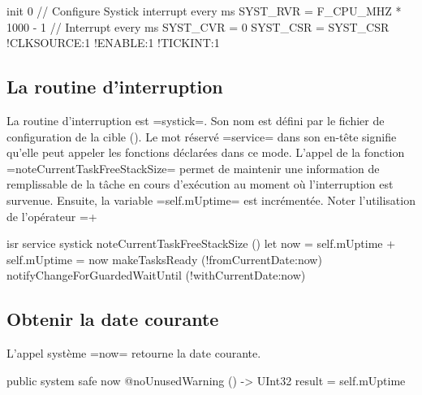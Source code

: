 \begin{OMNIBUS}
init 0 { // Configure Systick interrupt every ms
  SYST_RVR = F_CPU_MHZ * 1000 - 1 // Interrupt every ms
  SYST_CVR = 0
  SYST_CSR = {SYST_CSR !CLKSOURCE:1 !ENABLE:1 !TICKINT:1}
}
\end{OMNIBUS}


\subsection{La routine d'interruption}

La routine d'interruption est \omnibus=systick=. Son nom est défini par le fichier de configuration de la cible (). Le mot réservé \omnibus=service= dans son en-tête signifie qu'elle peut appeler les fonctions déclarées dans ce mode. L'appel de la fonction \omnibus=noteCurrentTaskFreeStackSize= permet de maintenir une information de remplissable de la tâche en cours d'exécution au moment où l'interruption est survenue. Ensuite, la variable \omnibus=self.mUptime= est incrémentée. Noter l'utilisation de l'opérateur \omnibus=+%

\begin{OMNIBUS}
isr service systick {
  noteCurrentTaskFreeStackSize ()
  let now = self.mUptime +%
  self.mUptime = now
  makeTasksReady (!fromCurrentDate:now)
  notifyChangeForGuardedWaitUntil (!withCurrentDate:now)
}
\end{OMNIBUS}




\subsection{Obtenir la date courante}

L'appel système \omnibus=now= retourne la date courante.

\begin{OMNIBUS}
public system safe now @noUnusedWarning () -> UInt32 {
  result = self.mUptime
}
\end{OMNIBUS}



